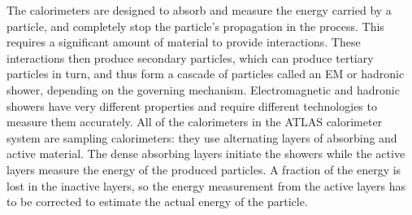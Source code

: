 
The calorimeters are designed to absorb and measure the energy carried by a particle, and completely stop the particle's propagation in the process.
This requires a significant amount of material to provide interactions.
These interactions then produce secondary particles, which can produce tertiary particles in turn, and thus form a cascade of particles called an \ac{EM} or hadronic shower, depending on the governing mechanism.
Electromagnetic and hadronic showers have very different properties and require different technologies to measure them accurately.
All of the calorimeters in the ATLAS calorimeter system are sampling calorimeters: they use alternating layers of absorbing and active material.
The dense absorbing layers initiate the showers while the active layers measure the energy of the produced particles.
A fraction of the energy is lost in the inactive layers, so the energy measurement from the active layers has to be corrected to estimate the actual energy of the particle.

